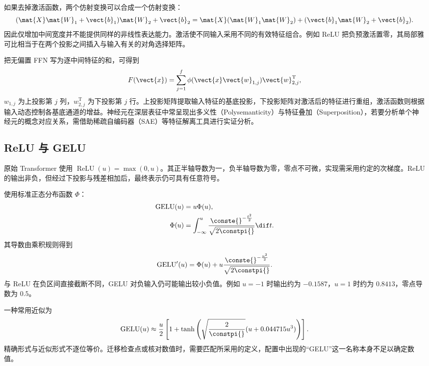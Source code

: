 \documentclass[../textbook.tex]{subfiles}
\begin{document}
如果去掉激活函数，两个仿射变换可以合成一个仿射变换：
\begin{equation}
 (\mat{X}\mat{W}_1+\vect{b}_1)\mat{W}_2+\vect{b}_2=\mat{X}(\mat{W}_1\mat{W}_2)+(\vect{b}_1\mat{W}_2+\vect{b}_2).
\end{equation}
因此仅增加中间宽度并不能提供同样的非线性表达能力。激活使不同输入采用不同的有效特征组合。例如 ReLU 把负预激活置零，其局部雅可比相当于在两个投影之间插入与输入有关的对角选择矩阵。

把无偏置 FFN 写为逐中间特征的和，可得到
\begin{equation}
 F(\vect{x})=\sum_{j=1}^{f}\phi(\vect{x}\vect{w}_{1,j})\vect{w}_{2,j}^{\mathrm{T}},
\end{equation}
$w_{1,j}$ 为上投影第 $j$ 列，$w_{2,j}^{\mathrm{T}}$ 为下投影第 $j$ 行。上投影矩阵提取输入特征的基底投影，下投影矩阵对激活后的特征进行重组，激活函数则根据输入动态控制各基底通道的增益。神经元在深层表征中常呈现出多义性（Polysemanticity）与特征叠加（Superposition），若要分析单个神经元的概念对应关系，需借助稀疏自编码器（SAE）等特征解离工具进行实证分析。

\subsection{ReLU 与 GELU}
原始 Transformer 使用 $\operatorname{ReLU}(u)=\max(0,u)$\cite{vaswani2017attention}。其正半轴导数为一，负半轴导数为零，零点不可微，实现需采用约定的次梯度。ReLU 的输出非负，但经过下投影与残差相加后，最终表示仍可具有任意符号。

使用标准正态分布函数 $\Phi$\cite{hendrycks2016gelu}：
\begin{equation}
 \begin{aligned}
  \operatorname{GELU}(u)&=u\Phi(u),\\
  \Phi(u)&=\int_{-\infty}^{u}\frac{\conste{}^{-\frac{t^2}{2}}}{\sqrt{2\constpi{}}}\dif t.
 \end{aligned}
\end{equation}
其导数由乘积规则得到
\begin{equation}
 \operatorname{GELU}'(u)=\Phi(u)+u\frac{\conste{}^{-\frac{u^2}{2}}}{\sqrt{2\constpi{}}}.
\end{equation}
与 ReLU 在负区间直接截断不同，GELU 对负输入仍可能输出较小负值。例如 $u=-1$ 时输出约为 $-0.1587$，$u=1$ 时约为 $0.8413$，零点导数为 $0.5$。

一种常用近似为
\begin{equation}
 \operatorname{GELU}(u)\approx\frac u2
 \left[1+\tanh\left(\sqrt{\frac2\constpi{}}(u+0.044715u^3)\right)\right].
\end{equation}
精确形式与近似形式不逐位等价。迁移检查点或核对数值时，需要匹配所采用的定义，配置中出现的“GELU”这一名称本身不足以确定数值。
\end{document}
